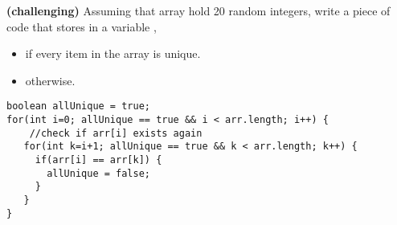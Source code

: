 \begin{questions}
\question \textbf{(challenging)} Assuming that array  hold 20 random integers, write a piece of code that stores in a variable ,

\begin{itemize}
\item {} if every item in the array  is unique.
\item {} otherwise.	
\end{itemize}

\begin{solution}
\begin{lstlisting}
boolean allUnique = true;
for(int i=0; allUnique == true && i < arr.length; i++) {
	//check if arr[i] exists again
   for(int k=i+1; allUnique == true && k < arr.length; k++) {
     if(arr[i] == arr[k]) {
       allUnique = false;
     }
   }
}
\end{lstlisting}
\end{solution}
\end{questions}